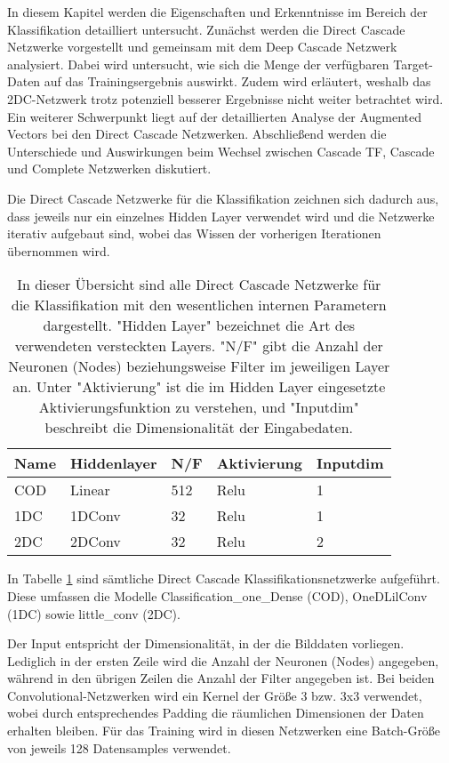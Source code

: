 In diesem Kapitel werden die Eigenschaften und Erkenntnisse im Bereich der Klassifikation detailliert untersucht. Zunächst werden die Direct 
Cascade Netzwerke vorgestellt und gemeinsam mit dem Deep Cascade Netzwerk analysiert. Dabei wird untersucht, wie sich die Menge der verfügbaren 
Target-Daten auf das Trainingsergebnis auswirkt. Zudem wird erläutert, weshalb das 2DC-Netzwerk trotz potenziell besserer Ergebnisse nicht weiter 
betrachtet wird. Ein weiterer Schwerpunkt liegt auf der detaillierten Analyse der Augmented Vectors bei den Direct Cascade Netzwerken. 
Abschließend werden die Unterschiede und Auswirkungen beim Wechsel zwischen Cascade TF, Cascade und Complete Netzwerken diskutiert.

Die Direct Cascade Netzwerke für die Klassifikation zeichnen sich dadurch aus, dass jeweils nur ein einzelnes Hidden Layer verwendet wird und die 
Netzwerke iterativ aufgebaut sind, wobei das Wissen der vorherigen Iterationen übernommen wird. 

\begin{table}[h!]
    \centering    
    \begin{tabular}{l|l|l|l|l}
        \textbf{Name} & \textbf{Hiddenlayer} & \textbf{N/F} & \textbf{Aktivierung} & \textbf{Inputdim} \\
        \hline
        COD & Linear & 512 & Relu & 1 \\
        1DC & 1DConv & 32 & Relu & 1 \\
        2DC & 2DConv & 32 & Relu & 2
    \end{tabular}
    \caption{\small{In dieser Übersicht sind alle Direct Cascade Netzwerke für die Klassifikation mit den wesentlichen internen Parametern 
    dargestellt. "Hidden Layer" bezeichnet die Art des verwendeten versteckten Layers. "N/F" gibt die Anzahl der Neuronen (Nodes) beziehungsweise 
    Filter im jeweiligen Layer an. Unter "Aktivierung" ist die im Hidden Layer eingesetzte Aktivierungsfunktion zu verstehen, und "Inputdim" 
    beschreibt die Dimensionalität der Eingabedaten.}}
        \label{tab:classvor}
\end{table}

In Tabelle \ref{tab:classvor} sind sämtliche Direct Cascade Klassifikationsnetzwerke aufgeführt. Diese umfassen die Modelle 
Classification\_one\_Dense (COD), OneDLilConv (1DC) sowie little\_conv (2DC).

Der Input entspricht der Dimensionalität, in der die Bilddaten vorliegen. Lediglich in der ersten Zeile wird die Anzahl der Neuronen (Nodes) 
angegeben, während in den übrigen Zeilen die Anzahl der Filter angegeben ist. Bei beiden Convolutional-Netzwerken wird ein Kernel der Größe 3 
bzw. 3x3 verwendet, wobei durch entsprechendes Padding die räumlichen Dimensionen der Daten erhalten bleiben. Für das Training wird in diesen 
Netzwerken eine Batch-Größe von jeweils 128 Datensamples verwendet.

